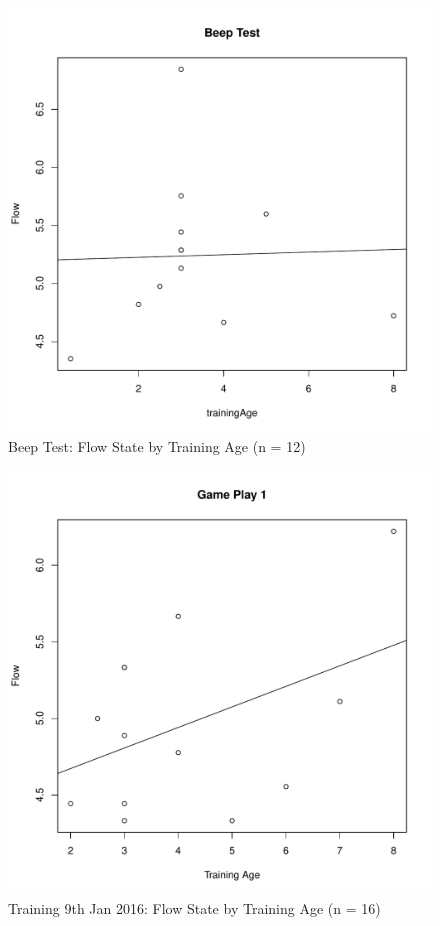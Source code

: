 \begin{CJK}{UTF8}{gbsn}
\begin{figure}[htbp]
  \centering
\includegraphics[scale=.3]{images/beepFlowTrainingAge.pdf}
  \caption{Beep Test: Flow State by Training Age (n = 12)}
  \label{fig:beepFlowTrainingAge}
\end{figure}

\begin{figure}[htbp]
  \centering
\includegraphics[scale=.3]{images/flow0109TrainingAge.pdf}
  \caption{Training 9th Jan 2016: Flow State by Training Age (n = 16)}
  \label{fig:flow0109TrainingAge}
\end{figure}


\end{CJK}
